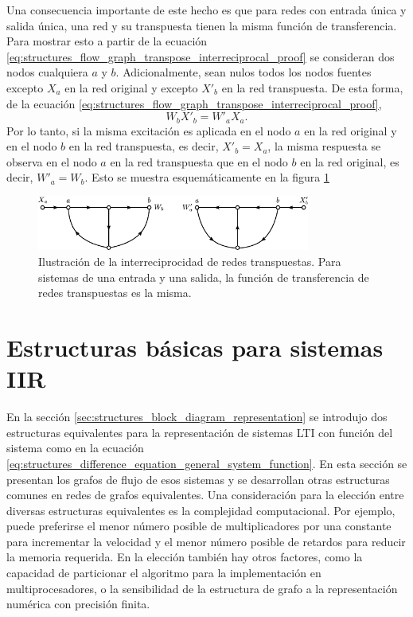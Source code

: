 \documentclass[a4paper]{report}
\begin{document}
Una consecuencia importante de este hecho es que para redes con entrada única y salida única, una red y su transpuesta tienen la misma función de transferencia. Para mostrar esto a partir de la ecuación \ref{eq:structures_flow_graph_transpose_interreciprocal_proof} se consideran dos nodos cualquiera \(a\) y \(b\). Adicionalmente, sean nulos todos los nodos fuentes excepto \(X_a\) en la red original y excepto \(X'_b\) en la red transpuesta. De esta forma, de la ecuación \ref{eq:structures_flow_graph_transpose_interreciprocal_proof},
\[
 W_bX'_b=W'_aX_a.
\]
Por lo tanto, si la misma excitación es aplicada en el nodo \(a\) en la red original y en el nodo \(b\) en la red transpuesta, es decir, \(X'_b=X_a\), la misma respuesta se observa en el nodo \(a\) en la red transpuesta que en el nodo \(b\) en la red original, es decir, \(W'_a=W_b\). Esto se muestra esquemáticamente en la figura \ref{fig:structures_flow_graph_transpose_interreciprocal}
\begin{figure}[!htb]
 \begin{center}
 \includegraphics[width=0.8\textwidth]{figuras/structures_flow_graph_transpose_interreciprocal.pdf}
 \caption{\label{fig:structures_flow_graph_transpose_interreciprocal} Ilustración de la interreciprocidad de redes transpuestas. Para sistemas de una entrada y una salida, la función de transferencia de redes transpuestas es la misma.}
 \end{center}
\end{figure}
 
\section{Estructuras básicas para sistemas IIR}\label{sec:structures_basic_iir}

En la sección \ref{sec:structures_block_diagram_representation} se introdujo dos estructuras equivalentes para la representación de sistemas LTI con función del sistema como en la ecuación \ref{eq:structures_difference_equation_general_system_function}. En esta sección se presentan los grafos de flujo de esos sistemas y se desarrollan otras estructuras comunes en redes de grafos equivalentes. Una consideración para la elección entre diversas estructuras equivalentes es la complejidad computacional. Por ejemplo, puede preferirse el menor número posible de multiplicadores por una constante para incrementar la velocidad y el menor número posible de retardos para reducir la memoria requerida. En la elección también hay otros factores, como la capacidad de particionar el algoritmo para la implementación en multiprocesadores, o la sensibilidad de la estructura de grafo a la representación numérica con precisión finita. 
\end{document}
